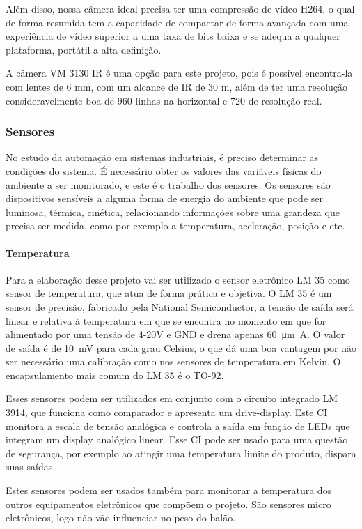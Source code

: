 	Além disso, nossa câmera ideal precisa ter uma compressão de vídeo H264, o qual de forma resumida tem a capacidade de compactar de forma avançada com uma experiência de vídeo superior a uma taxa de bits baixa e se adequa a qualquer plataforma, portátil a alta definição.

	A câmera VM 3130 IR é uma opção para este projeto, pois é possível encontra-la com lentes de 6 mm, com um alcance de IR de 30 m, além de ter uma resolução consideravelmente boa de 960 linhas na horizontal e 720 de resolução real.

\subsubsection{Sensores}
	No estudo da automação em sistemas industriais, é preciso determinar as condições do sistema. É necessário obter os valores das variáveis físicas do ambiente a ser monitorado, e este é o trabalho dos sensores.
	Os sensores são dispositivos sensíveis a alguma forma de energia do ambiente que pode ser luminosa, térmica, cinética, relacionando informações sobre uma grandeza que precisa ser medida, como por exemplo a temperatura, aceleração, posição e etc.

\paragraph{Temperatura}
	Para a elaboração desse projeto vai ser utilizado o sensor eletrônico LM 35 como sensor de temperatura, que atua de forma prática e objetiva. O LM 35 é um sensor de precisão, fabricado pela National Semiconductor, a tensão de saída será linear e relativa à temperatura em que se encontra no momento em que for alimentado por uma tensão de 4-20V e GND e drena apenas \SI{60}{\micro\metre\ampere}. O valor de saída é de \SI{10}{\milli\volt} para cada grau Celsius, o que dá uma boa vantagem por não ser necessário uma calibração como nos sensores de temperatura em Kelvin. O encapsulamento mais comum do LM 35 é o TO-92.~\cite{LM35}

	Esses sensores podem ser utilizados em conjunto com o circuito integrado LM 3914, que funciona como comparador e apresenta um drive-display. Este CI monitora a escala de tensão analógica e controla a saída em função de LEDs que integram um display analógico linear. Esse CI pode ser usado para uma questão de segurança, por exemplo ao atingir uma temperatura limite do produto, dispara suas saídas.~\cite{LM3914}

	Estes sensores podem ser usados também para monitorar a temperatura dos outros equipamentos eletrônicos que compõem o projeto. São sensores micro eletrônicos, logo não vão influenciar no peso do balão.

